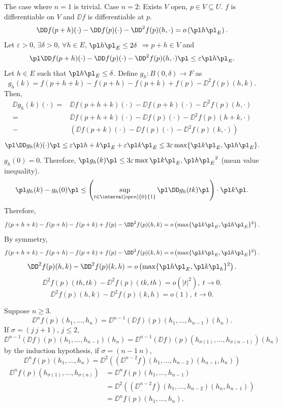\begin{proofenv}[By induction] 
    The case where $n=1$ is trivial.
    Case $n = 2$: Exists $V$ open, $p\in V\subseteq U$. $f$ is differentiable on $V$ and $\DD f$ is differentiable at $p$.
    $$ \DD f(p+h)(\cdot)-\DD f(p)(\cdot) -\DD^2 f(p)(h,\cdot)=o\left(\pl h\pl_E\right).$$
    Let $\varepsilon>0$, $\exists \delta>0$, $\forall h\in E$, $\pl h\pl_E\le 2\delta$ $\Rightarrow p+h\in V$ and
    $$ \pl \DD f(p+h)(\cdot)- \DD f(p)(\cdot) -\DD^2 f(p)(h,\cdot)\pl \le \varepsilon\pl h\pl_E.$$
    Let $h\in E$ such that $\pl h\pl_E\le \delta$. Define $g_h:B(0,\delta)\longrightarrow F$ as
    $$g_h(k)=f(p+h+k)-f(p+h)-f(p+k)+f(p)-\DD^2 f(p)(h,k).$$
    Then,
    \begin{align*}
        \DD g_h(k)(\cdot)=&\DD f(p+h+k)(\cdot)-\DD f(p+k)(\cdot)-\DD^2 f(p)(h,\cdot)\\
        =&\DD f(p+h+k)(\cdot)-\DD f(p)(\cdot)-\DD^2 f(p)(h+k,\cdot)\\
        -&(\DD f(p+k)(\cdot)-\DD f(p)(\cdot)-\DD^2 f(p)(k,\cdot))
    \end{align*}
    $$\pl \DD g_h(k)(\cdot)\pl \le \varepsilon\pl h+ k\pl_E+ \varepsilon\pl k\pl_E\le 3\varepsilon\max\{\pl k\pl_E,\pl h\pl_E\}.$$
    $g_h(0)=0$. Therefore, $\pl g_{h}(k)\pl \le 3\varepsilon\max{\pl k\pl_E,\pl h\pl_E}^2$ (mean value inequality).
    $$\pl g_h(k)- g_h(0)\pl\le \left(\sup_{t\in \interval[open]{0}{1}}\pl \DD g_h(tk)\pl\right)\cdot\pl k\pl .$$
    Therefore, 
    $$ f(p+h+k)-f(p+h)-f(p+k)+f(p)-\DD^2 f(p)(h,k)=o\left(\max\{\pl k\pl_E,\pl h\pl_E\}^2\right).$$
    By symmetry, 
    $$ f(p+h+k)-f(p+h)-f(p+k)+f(p)-\DD^2 f(p)(k,h)=o\left(\max\{\pl k\pl_E,\pl h\pl_E\}^2\right).$$
    $$\DD^2 f(p)(h,k)-\DD^2 f(p)(k,h)=o\left(\max\{\pl h\pl_E,\pl k\pl_h\}^2\right).$$
    $$ \DD^2 f(p)(th,tk)-\DD^2 f(p)(tk,th)=o(\left|t\right|^2),\ t\rightarrow 0.$$
    $$\DD^2 f(p)(h,k)-\DD^2 f(p)(k,h)=o(1),\ t\rightarrow 0.$$

    \quad Suppose $n\ge 3$.
    $$ \DD^n f(p)(h_1,\ldots,h_n)=\DD^{n-1}(\DD f)(p)(h_1,\ldots,h_{n-1})(h_n).$$
    If $\sigma=(j\ j+1)$, $j\le 2$,
    $$\DD^{n-1}(\DD f)(p)(h_1,\ldots,h_{n-1})(h_n)=\DD^{n-1}(\DD f)(p)(h_{\sigma(1)},\ldots,h_{\sigma(n-1)})(h_n)$$
    by the induction hypothesis, if $\sigma=(n-1\ n)$,
    $$\DD^n f(p)(h_1,\ldots,h_n)=\DD^2\left((\DD^{n-2} f)(h_1,\ldots,h_{n-2})(h_{n-1}, h_n)\right)$$
    \begin{align*}
        \DD^n f(p)(h_{\sigma(1)},\ldots,h_{\sigma(n)})&=\DD^n f(p)(h_1,\ldots,h_{n-1})\\
        &=\DD^2\left((\DD^{n-2} f)(h_1,\ldots,h_{n-2})(h_{n}, h_{n-1})\right)\\
        &=\DD^n f(p)(h_1,\ldots,h_{n}).
    \end{align*}
\end{proofenv}


